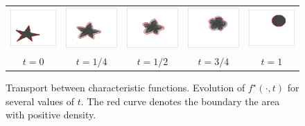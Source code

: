 \begin{figure}[!ht]
\begin{center}
\begin{tabular}{@{}c@{}c@{}c@{}c@{}c@{}}
\includegraphics[width=2.9cm]{images/shape/shape3_1}&
\includegraphics[width=2.9cm]{images/shape/shape3_17}&
\includegraphics[width=2.9cm]{images/shape/shape3_33}&
\includegraphics[width=2.9cm]{images/shape/shape3_49}&
\includegraphics[width=2.9cm]{images/shape/shape3_65}\\
$t=0$&
$t=1/4$&
$t=1/2$&
$t=3/4$&
$t=1$
\end{tabular}
\caption{\label{fig:indic} Transport between characteristic functions. Evolution of $f^\star(\cdot,t)$ for several values of $t$. The red curve denotes the boundary the area with positive density. }
\end{center}
\end{figure}


